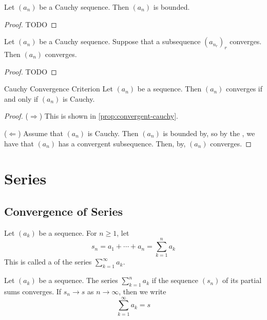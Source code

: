 \documentclass{styles/tufte}
\begin{document}
    \begin{proposition}{}{}
      Let $(a_n)$ be a Cauchy sequence. Then $(a_n)$ is bounded.
    \end{proposition}
    \begin{proof}
      TODO
    \end{proof}
    
    \begin{proposition}{}{}
      Let $(a_n)$ be a Cauchy sequence. Suppose that a subsequence $(a_{n_r})_r$ converges. Then $(a_n)$ converges.
    \end{proposition}
    \begin{proof}
      TODO
    \end{proof}
    
    \begin{theorem}{Cauchy Convergence Criterion}{}
      Let $(a_n)$ be a sequence. Then $(a_n)$ converges if and only if $(a_n)$ is Cauchy.
    \end{theorem}
    \begin{proof}
      ($\Rightarrow$) This is shown in \cref{prop:convergent-cauchy}.
      
      ($\Leftarrow$) Assume that $(a_n)$ is Cauchy. Then $(a_n)$ is bounded by, so by the , we have that $(a_n)$ has a convergent subsequence. Then, by, $(a_n)$ converges.
    \end{proof}




\section{Series}
  
  \subsection{Convergence of Series}
    
    \begin{definition}{}{}
      Let $(a_k)$ be a sequence. For $n \geqslant 1$, let
      \[ s_n = a_1 + \cdots + a_n = \sum_{k=1}^n a_k \]
      This is called a  of the series $\sum_{k=1}^\infty a_k$.
    \end{definition}
    
    \begin{definition}{}{}
      Let $(a_k)$ be a sequence. The series $\sum_{k=1}^n a_k$  if the sequence $(s_n)$ of its partial sums converges. If $s_n \to s$ as $n \to \infty$, then we write
      \[ \sum_{k=1}^\infty a_k = s \]
    \end{definition}
    
\end{document}
